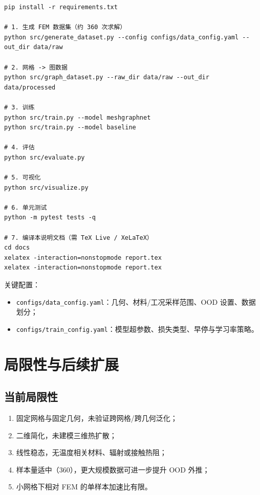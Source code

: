 \documentclass[11pt,a4paper]{article}
\begin{document}
\begin{lstlisting}
pip install -r requirements.txt

# 1. 生成 FEM 数据集（约 360 次求解）
python src/generate_dataset.py --config configs/data_config.yaml --out_dir data/raw

# 2. 网格 -> 图数据
python src/graph_dataset.py --raw_dir data/raw --out_dir data/processed

# 3. 训练
python src/train.py --model meshgraphnet
python src/train.py --model baseline

# 4. 评估
python src/evaluate.py

# 5. 可视化
python src/visualize.py

# 6. 单元测试
python -m pytest tests -q

# 7. 编译本说明文档（需 TeX Live / XeLaTeX）
cd docs
xelatex -interaction=nonstopmode report.tex
xelatex -interaction=nonstopmode report.tex
\end{lstlisting}

关键配置：
\begin{itemize}[leftmargin=1.5em]
  \item \texttt{configs/data\_config.yaml}：几何、材料/工况采样范围、OOD 设置、数据划分；
  \item \texttt{configs/train\_config.yaml}：模型超参数、损失类型、早停与学习率策略。
\end{itemize}


\section{局限性与后续扩展}

\subsection{当前局限性}
\begin{enumerate}[leftmargin=1.5em]
  \item 固定网格与固定几何，未验证跨网格/跨几何泛化；
  \item 二维简化，未建模三维热扩散；
  \item 线性稳态，无温度相关材料、辐射或接触热阻；
  \item 样本量适中（360），更大规模数据可进一步提升 OOD 外推；
  \item 小网格下相对 FEM 的单样本加速比有限。
\end{enumerate}
\end{document}

